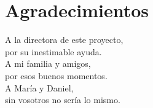\chapter*{Agradecimientos}
\begin{flushright}
A la directora de este proyecto,\\por su inestimable ayuda.\\[10pt]
A mi familia y amigos,\\por esos buenos momentos.\\[10pt]
A María y Daniel,\\sin vosotros no sería lo mismo.
\end{flushright}
\vfill
